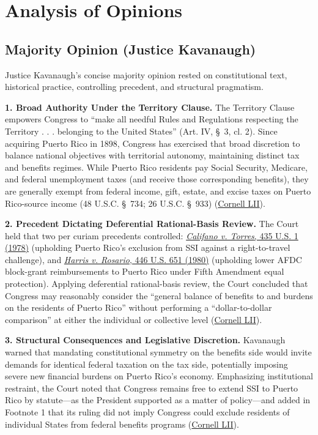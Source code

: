 \documentclass[12pt]{article}
\begin{document}
\section{Analysis of Opinions}
\subsection{Majority Opinion (Justice Kavanaugh)}

Justice Kavanaugh's concise majority opinion rested on constitutional text, historical practice, controlling precedent, and structural pragmatism.

\textbf{1. Broad Authority Under the Territory Clause.} The Territory Clause empowers Congress to ``make all needful Rules and Regulations respecting the Territory . . . belonging to the United States'' (Art. IV, \S~3, cl. 2). Since acquiring Puerto Rico in 1898, Congress has exercised that broad discretion to balance national objectives with territorial autonomy, maintaining distinct tax and benefits regimes. While Puerto Rico residents pay Social Security, Medicare, and federal unemployment taxes (and receive those corresponding benefits), they are generally exempt from federal income, gift, estate, and excise taxes on Puerto Rico-source income (48 U.S.C. \S~734; 26 U.S.C. \S~933) (\href{https://www.law.cornell.edu/supremecourt/text/20-303}{Cornell LII}).

\textbf{2. Precedent Dictating Deferential Rational-Basis Review.} The Court held that two per curiam precedents controlled: \href{https://supreme.justia.com/cases/federal/us/435/1/}{\emph{Califano v. Torres}, 435 U.S. 1 (1978)} (upholding Puerto Rico's exclusion from SSI against a right-to-travel challenge), and \href{https://supreme.justia.com/cases/federal/us/446/651/}{\emph{Harris v. Rosario}, 446 U.S. 651 (1980)} (upholding lower AFDC block-grant reimbursements to Puerto Rico under Fifth Amendment equal protection). Applying deferential rational-basis review, the Court concluded that Congress may reasonably consider the ``general balance of benefits to and burdens on the residents of Puerto Rico'' without performing a ``dollar-to-dollar comparison'' at either the individual or collective level (\href{https://www.law.cornell.edu/supremecourt/text/20-303}{Cornell LII}).

\textbf{3. Structural Consequences and Legislative Discretion.} Kavanaugh warned that mandating constitutional symmetry on the benefits side would invite demands for identical federal taxation on the tax side, potentially imposing severe new financial burdens on Puerto Rico's economy. Emphasizing institutional restraint, the Court noted that Congress remains free to extend SSI to Puerto Rico by statute---as the President supported as a matter of policy---and added in Footnote 1 that its ruling did not imply Congress could exclude residents of individual States from federal benefits programs (\href{https://www.law.cornell.edu/supremecourt/text/20-303}{Cornell LII}).
\end{document}
